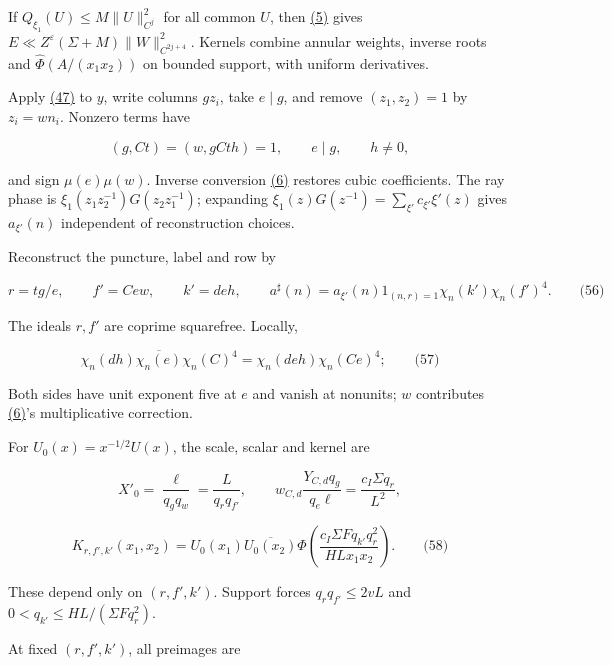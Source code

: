 If \(Q_{\xi_1}(U)\le M\|U\|_{C^j}^2\) for all common \(U\), then \protect\hyperlink{cf:eq:1.4}{(5)} gives \(E\ll Z^\varepsilon(\Sigma+M)\|W\|_{C^{2j+4}}^2\). Kernels combine annular weights, inverse roots and \(\widehat\Phi(A/(x_1x_2))\) on bounded support, with uniform derivatives.

Apply \protect\hyperlink{cf:eq:C.3}{(47)} to \(y\), write columns \(gz_i\), take \(e\mid g\), and remove \((z_1,z_2)=1\) by \(z_i=wn_i\). Nonzero terms have

\[
(g,Ct)=(w,gCth)=1,\qquad e\mid g,\qquad h\ne0,
\]

and sign \(\mu(e)\mu(w)\). Inverse conversion \protect\hyperlink{cf:eq:A.1}{(6)} restores cubic coefficients. The ray phase is \(\xi_1(z_1z_2^{-1})G(z_2z_1^{-1})\); expanding \(\xi_1(z)G(z^{-1})=\sum_{\xi'}c_{\xi'}\xi'(z)\) gives \(a_{\xi'}(n)\) independent of reconstruction choices.

Reconstruct the puncture, label and row by

\hypertarget{cf:eq:C.12}{}

\label{cf:eq:C.12}

\[
r=tg/e,\qquad f'=Cew,\qquad k'=deh,
\qquad a^\sharp(n)=a_{\xi'}(n)1_{(n,r)=1}\chi_n(k')\chi_n(f')^4.
\qquad\text{(56)}
\]

The ideals \(r,f'\) are coprime squarefree. Locally,

\hypertarget{cf:eq:C.13}{}

\label{cf:eq:C.13}

\[
\chi_n(dh)\overline{\chi_n(e)}\chi_n(C)^4
=\chi_n(deh)\chi_n(Ce)^4;
\qquad\text{(57)}
\]

Both sides have unit exponent five at \(e\) and vanish at nonunits; \(w\) contributes \protect\hyperlink{cf:eq:A.1}{(6)}'s multiplicative correction.

For \(U_0(x)=x^{-1/2}U(x)\), the scale, scalar and kernel are

\[
X'_0=\frac\ell{q_gq_w}=\frac L{q_rq_{f'}},
\qquad w_{C,d}\frac{Y_{C,d}q_g}{q_e\ell}=\frac{c_I\Sigma q_r}{L^2},
\]

\hypertarget{cf:eq:C.14}{}

\label{cf:eq:C.14}

\[
K_{r,f',k'}(x_1,x_2)=U_0(x_1)\overline{U_0(x_2)}
\widehat\Phi\!\left(\frac{c_I\Sigma Fq_{k'}q_r^2}{HLx_1x_2}\right).
\qquad\text{(58)}
\]

These depend only on \((r,f',k')\). Support forces \(q_rq_{f'}\le2vL\) and \(0<q_{k'}\le HL/(\Sigma Fq_r^2)\).

At fixed \((r,f',k')\), all preimages are

